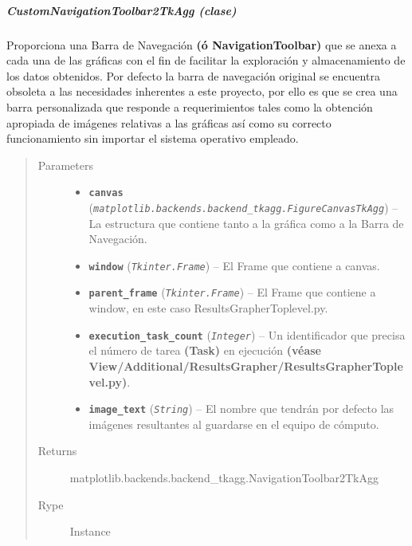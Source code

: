 \documentclass[class=report, crop=false]{standalone}
\begin{document}
\subparagraph{CustomNavigationToolbar2TkAgg (clase)}
\label{sec:a_3_3_3_1_1_1}
\begin{fulllineitems}

\begin{DUlineblock}{0em}
\item[] Proporciona una Barra de Navegación \textbf{(ó NavigationToolbar)} 
que se anexa a cada una de las gráficas con el fin de facilitar la exploración 
y almacenamiento de los datos obtenidos.\break
Por defecto la barra de navegación original se encuentra obsoleta a las 
necesidades inherentes a este proyecto, por ello es que se crea una barra 
personalizada que responde a requerimientos tales como la obtención apropiada 
de imágenes relativas a las gráficas así como su correcto funcionamiento sin 
importar el sistema operativo empleado.
\end{DUlineblock}

\begin{quote}\begin{description}
\item[{Parameters}] \leavevmode\begin{itemize}
\item \textbf{\texttt{canvas}} (\emph{\texttt{matplotlib.backends.backend\_tkagg.\break FigureCanvasTkAgg}}) -- La estructura que contiene tanto a la gráfica como a la Barra de Navegación.
\item \textbf{\texttt{window}} (\emph{\texttt{Tkinter.Frame}}) -- El Frame que contiene a canvas.
\item \textbf{\texttt{parent\_frame}} (\emph{\texttt{Tkinter.Frame}}) -- El Frame que contiene a window, en este caso ResultsGrapherToplevel.py.
\item \textbf{\texttt{execution\_task\_count}} (\emph{\texttt{Integer}}) -- Un identificador que precisa el número de tarea \textbf{(Task)} en ejecución \textbf{(véase View/Additional/ResultsGrapher/}\break\textbf{ResultsGrapherToplevel.py)}.
\item \textbf{\texttt{image\_text}} (\emph{\texttt{String}}) -- El nombre que tendrán por defecto las imágenes resultantes al guardarse en el equipo de cómputo.
\end{itemize}

\item[{Returns}] \leavevmode
matplotlib.backends.backend\_tkagg.NavigationToolbar2TkAgg
\item[{Rype}] \leavevmode
Instance
\end{description}\end{quote}


\end{fulllineitems}
\end{document}
